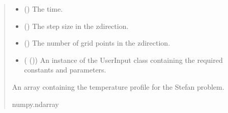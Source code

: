 \documentclass[a4paper,11pt,english,openany]{sphinxmanual}
\begin{document}
\begin{fulllineitems}
\begin{fulllineitems}
\begin{quote}
\begin{description}
\begin{itemize}
\item {} 
\sphinxAtStartPar
{} () \textendash{} The time.

\item {} 
\sphinxAtStartPar
{} () \textendash{} The step size in the z\sphinxhyphen{}direction.

\item {} 
\sphinxAtStartPar
{} () \textendash{} The number of grid points in the z\sphinxhyphen{}direction.

\item {} 
\sphinxAtStartPar
{} ({\hyperref[\detokenize{api/spyice.parameters.user_input:src.spyice.parameters.user_input.UserInput}]{}} ()) \textendash{} An instance of the UserInput class containing the required constants and parameters.

\end{itemize}

\sphinxAtStartPar
An array containing the temperature profile for the Stefan problem.

\sphinxAtStartPar
numpy.ndarray

\end{description}\end{quote}

\end{fulllineitems}



\end{fulllineitems}
\end{document}
